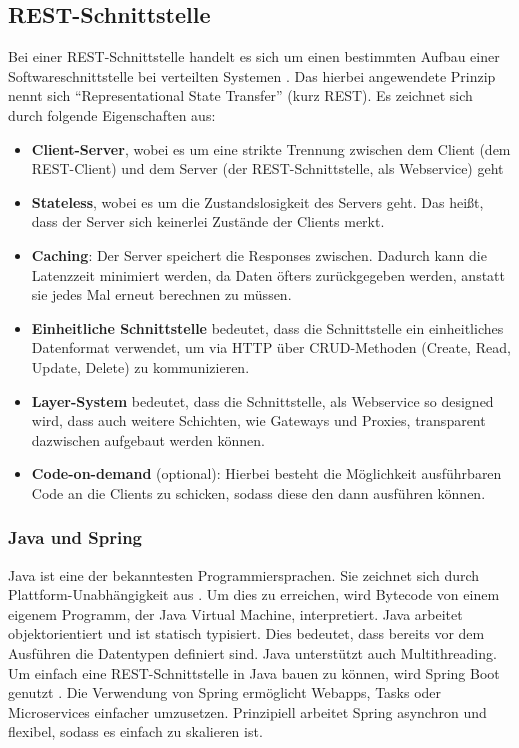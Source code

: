 	\subsection{REST-Schnittstelle}
	Bei einer REST-Schnittstelle handelt es sich um einen bestimmten Aufbau einer Softwareschnittstelle bei verteilten Systemen \cite{Patni2017}. Das hierbei angewendete Prinzip nennt sich \enquote{Representational State Transfer} (kurz REST). Es zeichnet sich durch folgende Eigenschaften aus:
	\begin{itemize}
		\item \textbf{Client-Server}, wobei es um eine strikte Trennung zwischen dem Client (dem REST-Client) und dem Server (der REST-Schnittstelle, als Webservice) geht
		\item \textbf{Stateless}, wobei es um die Zustandslosigkeit des Servers geht. Das heißt, dass der Server sich keinerlei Zustände der Clients merkt.
		\item \textbf{Caching}: Der Server speichert die Responses zwischen. Dadurch kann die Latenzzeit minimiert werden, da Daten öfters zurückgegeben werden, anstatt sie jedes Mal erneut berechnen zu müssen.
		\item \textbf{Einheitliche Schnittstelle} bedeutet, dass die Schnittstelle ein einheitliches Datenformat verwendet, um via HTTP über CRUD-Methoden (Create, Read, Update, Delete) zu kommunizieren.
		\item \textbf{Layer-System} bedeutet, dass die Schnittstelle, als Webservice so designed wird, dass auch weitere Schichten, wie Gateways und Proxies, transparent dazwischen aufgebaut werden können.
		\item \textbf{Code-on-demand} (optional): Hierbei besteht die Möglichkeit ausführbaren Code an die Clients zu schicken, sodass diese den dann ausführen können.
	\end{itemize}
	\label{code:rest}
		\subsubsection{Java und Spring}
		Java ist eine der bekanntesten Programmiersprachen. Sie zeichnet sich durch Plattform-Unabhängigkeit aus \cite{jdkDocs}. Um dies zu erreichen, wird Bytecode von einem eigenem Programm, der Java Virtual Machine, interpretiert. Java arbeitet objektorientiert und ist statisch typisiert. Dies bedeutet, dass bereits vor dem Ausführen die Datentypen definiert sind. Java unterstützt auch Multithreading. Um einfach eine REST-Schnittstelle in Java bauen zu können, wird Spring Boot genutzt \cite{springDocs}. Die Verwendung von Spring ermöglicht Webapps, Tasks oder Microservices einfacher umzusetzen. Prinzipiell arbeitet Spring asynchron und flexibel, sodass es einfach zu skalieren ist. 
		
